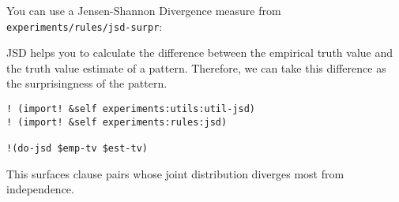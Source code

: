 \documentclass{article}
\begin{document}
You can use a Jensen-Shannon Divergence measure from \texttt{experiments/rules/jsd-surpr}:

JSD helps you to calculate the difference between the empirical truth value and the truth value estimate of a pattern. Therefore, we can take this difference as the surprisingness of the pattern.

\begin{verbatim}
! (import! &self experiments:utils:util-jsd)
! (import! &self experiments:rules:jsd)

!(do-jsd $emp-tv $est-tv) 
\end{verbatim}

This surfaces clause pairs whose joint distribution diverges most from independence.
\end{document}
